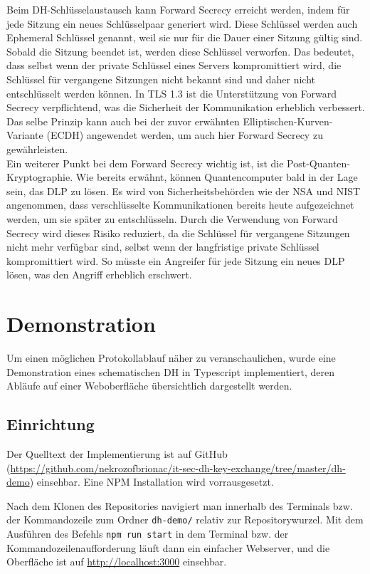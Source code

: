 \documentclass[conference]{IEEEtran}
\begin{document}
Beim DH-Schlüsselaustausch kann Forward Secrecy erreicht werden, indem für jede Sitzung ein neues Schlüsselpaar generiert wird. Diese Schlüssel werden auch Ephemeral Schlüssel genannt, weil sie nur für die Dauer einer Sitzung gültig sind. Sobald die Sitzung beendet ist, werden diese Schlüssel verworfen. Das bedeutet, dass selbst wenn der private Schlüssel eines Servers kompromittiert wird, die Schlüssel für vergangene Sitzungen nicht bekannt sind und daher nicht entschlüsselt werden können. In TLS 1.3 ist die Unterstützung von Forward Secrecy verpflichtend, was die Sicherheit der Kommunikation erheblich verbessert.\cite{logjam}\cite[§1.2]{rfc8446}
Das selbe Prinzip kann auch bei der zuvor erwähnten Elliptischen-Kurven-Variante (ECDH) angewendet werden, um auch hier Forward Secrecy zu gewährleisten.
\\


Ein weiterer Punkt bei dem Forward Secrecy wichtig ist, ist die Post-Quanten-Kryptographie. Wie bereits erwähnt, können Quantencomputer bald in der Lage sein, das DLP zu lösen. Es wird von Sicherheitsbehörden wie der NSA und NIST angenommen, dass verschlüsselte Kommunikationen bereits heute aufgezeichnet werden, um sie später zu entschlüsseln.\cite{nist-pqc} Durch die Verwendung von Forward Secrecy wird dieses Risiko reduziert, da die Schlüssel für vergangene Sitzungen nicht mehr verfügbar sind, selbst wenn der langfristige private Schlüssel kompromittiert wird. So müsste ein Angreifer für jede Sitzung ein neues DLP lösen, was den Angriff erheblich erschwert.



\section{Demonstration}

Um einen möglichen Protokollablauf näher zu veranschaulichen, wurde eine Demonstration
eines schematischen DH in Typescript implementiert, deren Abläufe auf einer Weboberfläche
übersichtlich dargestellt werden.

\subsection{Einrichtung}

Der Quelltext der Implementierung ist auf GitHub
(\url{https://github.com/nekrozofbrionac/it-sec-dh-key-exchange/tree/master/dh-demo})
einsehbar. Eine NPM Installation wird vorrausgesetzt.

Nach dem Klonen des Repositories navigiert man innerhalb des Terminals
bzw. der Kommandozeile zum Ordner \verb|dh-demo/| relativ zur Repositorywurzel.
Mit dem Ausführen des Befehls \verb|npm run start| in dem Terminal
bzw. der Kommandozeilenaufforderung läuft dann ein einfacher Webserver,
und die Oberfläche ist auf \url{http://localhost:3000} einsehbar.
\end{document}
